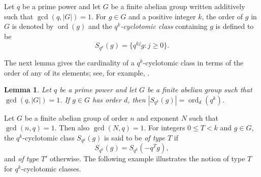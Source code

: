 \documentclass[pdflatex,sn-mathphys-num]{sn-jnl}%
\theoremstyle{thmstyleone}%
\newtheorem{lemma}[theorem]{Lemma}%
\theoremstyle{thmstyletwo}%
\theoremstyle{thmstylethree}%
\newcommand{\ord}{\operatorname{ord}}
\begin{document}
Let $q$ be a prime power and let  $G$ be a finite abelian group written additively such that $\gcd(q,|G|)=1$.  For $g\in G$ and a positive integer $k$, the order of $g$ in $G$ is denoted by $\ord(g)$ and the \emph{$q^k$-cyclotomic class} containing $g$ is defined to be
\[
S_{q^k}(g)=\{q^{kj}g:j\ge 0\}.
\]


The next lemma gives the cardinality of a $q^k$-cyclotomic class in terms of the order of any of its elements; see, for example, \cite{PJ2018}.
 
\begin{lemma}
\label{lem:cosetsize}
Let $q$ be a prime power and let $G$ be a finite abelian group such that $\gcd(q,|G|)=1$. If $g\in G$ has order $d$, then
$
|S_{q^k}(g)|=\ord_d(q^k)$.
\end{lemma}

 

Let $G$ be a finite abelian group of order $n$ and exponent $N$ such that $\gcd(n,q)=1$. Then also $\gcd(N,q)=1$. For integers $0\le T<k$ and $g\in G$, the $q^k$-cyclotomic class $S_{q^k}(g)$ is said to be \emph{of type $T$} if
\[
S_{q^k}(g)=S_{q^k}(-q^Tg),
\]
and \emph{of type $T'$} otherwise. The following example illustrates the notion of type $T$ for $q^k$-cyclotomic classes.
\end{document}
